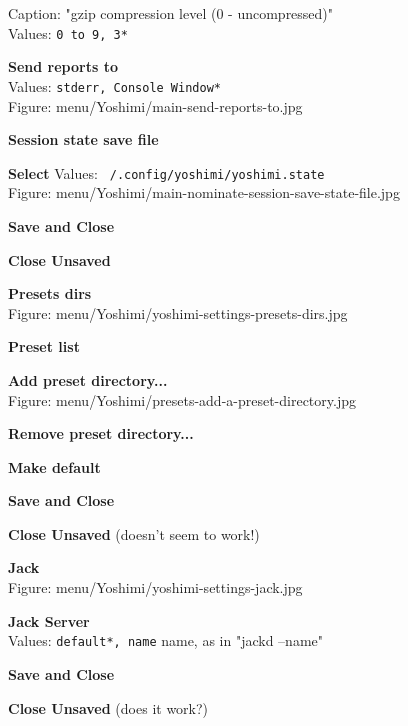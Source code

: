 \documentclass[
 11pt,
 twoside,
 a4paper,
 headinclude,
 footinclude,
 final                                 %
]{article}
\begin{document}
\begin{enumber}
\begin{enumber}
\begin{enumber}
\begin{enumber}
\begin{enumber}
                  Caption: "gzip compression level (0 - uncompressed)" \\
                  Values: \texttt{0 to 9, 3*}
               \item \textbf{Send reports to} \\
                  Values: \texttt{stderr, Console Window*} \\
                  Figure: menu/Yoshimi/main-send-reports-to.jpg
               \item \textbf{Session state save file}
               \item \textbf{Select}
                  Values: \texttt{~/.config/yoshimi/yoshimi.state} \\
                  Figure: menu/Yoshimi/main-nominate-session-save-state-file.jpg
               \item \textbf{Save and Close}
               \item \textbf{Close Unsaved}
            \end{enumber}
            \item \textbf{Presets dirs} \\
               Figure: menu/Yoshimi/yoshimi-settings-presets-dirs.jpg
            \begin{enumber}
               \item \textbf{Preset list}
               \item \textbf{Add preset directory...} \\
                  Figure: menu/Yoshimi/presets-add-a-preset-directory.jpg
               \item \textbf{Remove preset directory...}
               \item \textbf{Make default}
               \item \textbf{Save and Close}
               \item \textbf{Close Unsaved} (doesn't seem to work!)
            \end{enumber}
            \item \textbf{Jack} \\
               Figure: menu/Yoshimi/yoshimi-settings-jack.jpg
            \begin{enumber}
               \item \textbf{Jack Server} \\
               Values: \texttt{default*, name} name, as in "jackd --name"
               \item \textbf{Save and Close}
               \item \textbf{Close Unsaved} (does it work?)

\end{enumber}
\end{enumber}
\end{enumber}
\end{enumber}
\end{enumber}
\end{document}
